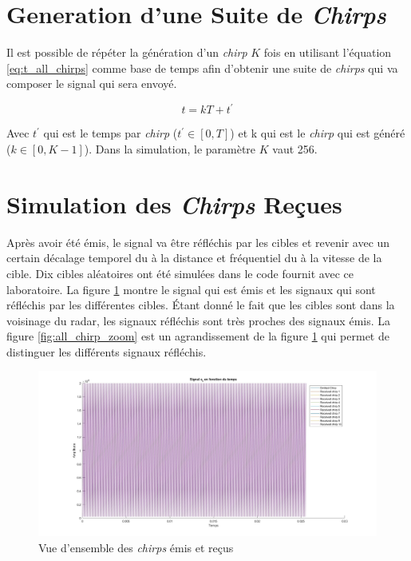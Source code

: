 \section{Generation d'une Suite de \textit{Chirps}}

Il est possible de répéter la génération d'un \textit{chirp} $K$ fois en utilisant l'équation \ref{eq:t_all_chirps} comme base de temps afin d'obtenir une suite de \textit{chirps} qui va composer le signal qui sera envoyé.

\begin{equation}
    t = kT + t^\prime
    \label{eq:t_all_chirps}
\end{equation}

 Avec $t^\prime$ qui est le temps par \textit{chirp} (\(t^\prime \in [0,T]\)) et k qui est le \textit{chirp} qui est généré (\(k \in [0,K-1]\)). Dans la simulation, le paramètre $K$ vaut 256.

\section{Simulation des \textit{Chirps} Reçues}

Après avoir été émis, le signal va être réfléchis par les cibles et revenir avec un certain décalage temporel du à la distance et fréquentiel du à la vitesse de la cible. Dix cibles aléatoires ont été simulées dans le code fournit avec ce laboratoire. La figure \ref{fig:all_chirp} montre le signal qui est émis et les signaux qui sont réfléchis par les différentes cibles. Étant donné le fait que les cibles sont dans la voisinage du radar, les signaux réfléchis sont très proches des signaux émis. La figure \ref{fig:all_chirp_zoom} est un agrandissement de la figure \ref{fig:all_chirp} qui permet de distinguer les différents signaux réfléchis. 

\begin{figure}[H]
  \centering
  \includegraphics[scale = 0.2]{Pictures/multiple_target.jpg}  \caption{Vue d'ensemble des \textit{chirps} émis et reçus}
  \label{fig:all_chirp}
\end{figure}

